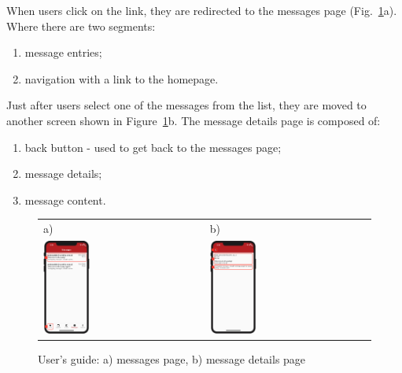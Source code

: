 When users click on the link, they are redirected to the messages page (Fig.~\ref{fig:users-guide-message-and-details}a). Where there are two segments:
\begin{enumerate}
    \item message entries;
    \item navigation with a link to the homepage.
\end{enumerate}

Just after users select one of the messages from the list, they are moved to another screen shown in Figure~\ref{fig:users-guide-message-and-details}b. The message details page is composed of:
\begin{enumerate}
    \item back button - used to get back to the messages page;
    \item message details;
    \item message content.
\end{enumerate}

\begin{figure}[htb]
    \centering
    \begin{tabular}{@{}ll@{}}
        a) & b) \\
        {\includegraphics[width=0.3\textwidth]{figC/messages_page.png}} &
        {\includegraphics[width=0.3\textwidth]{figC/message_details.png}} \\
    \end{tabular}
    \caption{User's guide: a) messages page, b) message details page} \label{fig:users-guide-message-and-details}
\end{figure}
